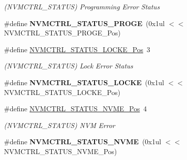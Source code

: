 \begin{DoxyCompactItemize}
\begin{DoxyCompactList}\small\item\em (N\+V\+M\+C\+T\+R\+L\+\_\+\+S\+T\+A\+T\+U\+S) Programming Error Status \end{DoxyCompactList}\item 
\hypertarget{group___s_a_m_l21___n_v_m_c_t_r_l_ga1e724b991e54d3d59cbe47774e7c0df4}{}\#define {\bfseries N\+V\+M\+C\+T\+R\+L\+\_\+\+S\+T\+A\+T\+U\+S\+\_\+\+P\+R\+O\+G\+E}~(0x1ul $<$$<$ N\+V\+M\+C\+T\+R\+L\+\_\+\+S\+T\+A\+T\+U\+S\+\_\+\+P\+R\+O\+G\+E\+\_\+\+Pos)\label{group___s_a_m_l21___n_v_m_c_t_r_l_ga1e724b991e54d3d59cbe47774e7c0df4}

\item 
\hypertarget{group___s_a_m_l21___n_v_m_c_t_r_l_ga425654bd99f5c0f035b444932ad9d698}{}\#define \hyperlink{group___s_a_m_l21___n_v_m_c_t_r_l_ga425654bd99f5c0f035b444932ad9d698}{N\+V\+M\+C\+T\+R\+L\+\_\+\+S\+T\+A\+T\+U\+S\+\_\+\+L\+O\+C\+K\+E\+\_\+\+Pos}~3\label{group___s_a_m_l21___n_v_m_c_t_r_l_ga425654bd99f5c0f035b444932ad9d698}

\begin{DoxyCompactList}\small\item\em (N\+V\+M\+C\+T\+R\+L\+\_\+\+S\+T\+A\+T\+U\+S) Lock Error Status \end{DoxyCompactList}\item 
\hypertarget{group___s_a_m_l21___n_v_m_c_t_r_l_gad10b2faf4e6af34fc8a163ff96f54cc5}{}\#define {\bfseries N\+V\+M\+C\+T\+R\+L\+\_\+\+S\+T\+A\+T\+U\+S\+\_\+\+L\+O\+C\+K\+E}~(0x1ul $<$$<$ N\+V\+M\+C\+T\+R\+L\+\_\+\+S\+T\+A\+T\+U\+S\+\_\+\+L\+O\+C\+K\+E\+\_\+\+Pos)\label{group___s_a_m_l21___n_v_m_c_t_r_l_gad10b2faf4e6af34fc8a163ff96f54cc5}

\item 
\hypertarget{group___s_a_m_l21___n_v_m_c_t_r_l_ga0e5c4f746519844207a933b98d3fd883}{}\#define \hyperlink{group___s_a_m_l21___n_v_m_c_t_r_l_ga0e5c4f746519844207a933b98d3fd883}{N\+V\+M\+C\+T\+R\+L\+\_\+\+S\+T\+A\+T\+U\+S\+\_\+\+N\+V\+M\+E\+\_\+\+Pos}~4\label{group___s_a_m_l21___n_v_m_c_t_r_l_ga0e5c4f746519844207a933b98d3fd883}

\begin{DoxyCompactList}\small\item\em (N\+V\+M\+C\+T\+R\+L\+\_\+\+S\+T\+A\+T\+U\+S) N\+V\+M Error \end{DoxyCompactList}\item 
\hypertarget{group___s_a_m_l21___n_v_m_c_t_r_l_gaf1648cdd416b1b9c59c36664ca71480b}{}\#define {\bfseries N\+V\+M\+C\+T\+R\+L\+\_\+\+S\+T\+A\+T\+U\+S\+\_\+\+N\+V\+M\+E}~(0x1ul $<$$<$ N\+V\+M\+C\+T\+R\+L\+\_\+\+S\+T\+A\+T\+U\+S\+\_\+\+N\+V\+M\+E\+\_\+\+Pos)\label{group___s_a_m_l21___n_v_m_c_t_r_l_gaf1648cdd416b1b9c59c36664ca71480b}


\end{DoxyCompactItemize}
